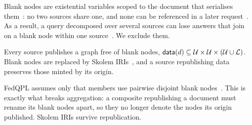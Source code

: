 Blank nodes are existential variables scoped to the document that serialises
them~\cite{rdf11concepts}: no two sources share one, and none can be referenced in a
later request~\cite{prudhommeaux2013federated}. As a result, a query decomposed over
several sources can lose answers that join on a blank node within one
source~\cite{stolpe2017blank}. We exclude them.

\begin{assumption}
\label{as:skolem}
Every source publishes a graph free of blank nodes,
$\mathsf{data}(d) \subseteq \mathcal{U} \times \mathcal{U} \times (\mathcal{U} \cup \mathcal{L})$.
Blank nodes are replaced by Skolem IRIs~\cite{rdf11concepts}, and a source republishing
data preserves those minted by its origin.
\end{assumption}

FedQPL assumes only that members use pairwise disjoint blank
nodes~\cite{cheng2020fedqpl}. This is exactly what breaks aggregation: a composite
republishing a document must rename its blank nodes apart, so they no longer denote
the nodes its origin published. Skolem IRIs survive republication.


